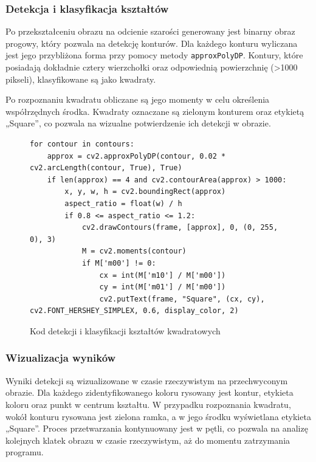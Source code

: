 \subsubsection{Detekcja i klasyfikacja kształtów}

Po przekształceniu obrazu na odcienie szarości generowany jest binarny obraz progowy, który pozwala na detekcję konturów. Dla każdego konturu wyliczana jest jego przybliżona forma przy pomocy metody \texttt{approxPolyDP}. Kontury, które posiadają dokładnie cztery wierzchołki oraz odpowiednią powierzchnię (>1000 pikseli), klasyfikowane są jako kwadraty.

Po rozpoznaniu kwadratu obliczane są jego momenty w celu określenia współrzędnych środka. Kwadraty oznaczane są zielonym konturem oraz etykietą „Square”, co pozwala na wizualne potwierdzenie ich detekcji w obrazie.

\begin{figure}[H]
  \centering
  \begin{lstlisting}
for contour in contours:
    approx = cv2.approxPolyDP(contour, 0.02 * cv2.arcLength(contour, True), True)
    if len(approx) == 4 and cv2.contourArea(approx) > 1000:
        x, y, w, h = cv2.boundingRect(approx)
        aspect_ratio = float(w) / h
        if 0.8 <= aspect_ratio <= 1.2:
            cv2.drawContours(frame, [approx], 0, (0, 255, 0), 3)
            M = cv2.moments(contour)
            if M['m00'] != 0:
                cx = int(M['m10'] / M['m00'])
                cy = int(M['m01'] / M['m00'])
                cv2.putText(frame, "Square", (cx, cy), cv2.FONT_HERSHEY_SIMPLEX, 0.6, display_color, 2)
  \end{lstlisting}
  \caption{Kod detekcji i klasyfikacji kształtów kwadratowych}
  \label{fig:square_detection}
\end{figure}

\subsubsection{Wizualizacja wyników}

Wyniki detekcji są wizualizowane w czasie rzeczywistym na przechwyconym obrazie. Dla każdego zidentyfikowanego koloru rysowany jest kontur, etykieta koloru oraz punkt w centrum kształtu. W przypadku rozpoznania kwadratu, wokół konturu rysowana jest zielona ramka, a w jego środku wyświetlana etykieta „Square”. Proces przetwarzania kontynuowany jest w pętli, co pozwala na analizę kolejnych klatek obrazu w czasie rzeczywistym, aż do momentu zatrzymania programu.


